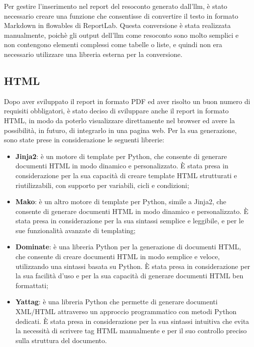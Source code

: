 Per gestire l'inserimento nel report del resoconto generato dall'\gls{llm}, è stato necessario creare una funzione che consentisse di convertire il testo in formato Markdown in flowables di ReportLab. Questa conversione è stata realizzata manualmente, poichè gli output dell'\gls{llm} come resoconto sono molto semplici e non contengono elementi complessi come tabelle o liste, e quindi non era necessario utilizzare una libreria esterna per la conversione.


\subsection{HTML}

Dopo aver sviluppato il report in formato PDF ed aver risolto un buon numero di requisiti obbligatori, è stato deciso di sviluppare anche il report in formato HTML, in modo da poterlo visualizzare direttamente nel browser ed avere la possibilità, in futuro, di integrarlo in una pagina web. Per la sua generazione, sono state prese in considerazione le seguenti librerie:
\begin{itemize}
    \item \textbf{Jinja2}: è un motore di template per Python, che consente di generare documenti HTML in modo dinamico e personalizzato. È stata presa in considerazione per la sua capacità di creare template HTML strutturati e riutilizzabili, con supporto per variabili, cicli e condizioni;
    \item \textbf{Mako}: è un altro motore di template per Python, simile a Jinja2, che consente di generare documenti HTML in modo dinamico e personalizzato. È stata presa in considerazione per la sua sintassi semplice e leggibile, e per le sue funzionalità avanzate di templating;
    \item \textbf{Dominate}: è una libreria Python per la generazione di documenti HTML, che consente di creare documenti HTML in modo semplice e veloce, utilizzando una sintassi basata su Python. È stata presa in considerazione per la sua facilità d'uso e per la sua capacità di generare documenti HTML ben formattati;
    \item \textbf{Yattag}: è una libreria Python che permette di generare documenti XML/HTML attraverso un approccio programmatico con metodi Python dedicati. È stata presa in considerazione per la sua sintassi intuitiva che evita la necessità di scrivere tag HTML manualmente e per il suo controllo preciso sulla struttura del documento.
\end{itemize}

